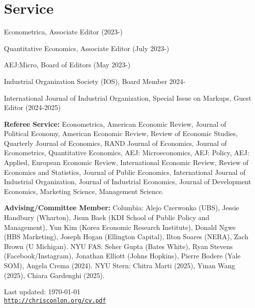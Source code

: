 \documentclass[letterpaper]{article}
\def\footerlink{http://chrisconlon.org/cv.pdf}
\renewenvironment{itemize}{
  \begin{list}{}{
    \setlength{\leftmargin}{1.5em}
  }
}{
  \end{list}
}
\begin{document}
\section*{Service}
\begin{itemize}
\item Econometrica, Associate Editor (2023-)
\item Quantitative Economics,  Associate Editor (July 2023-)
\item AEJ:Micro, Board of Editors (May 2023-)
\item Industrial Organization Society (IOS), Board Member 2024-
\item International Journal of Industrial Organization, Special Issue on Markups, Guest Editor (2024-2025)
\item \textbf{Referee Service:} Econometrica, American Economic Review, Journal of Political Economy, American Economic Review, Review of Economic Studies, Quarterly Journal of Economics, RAND Journal of Economics, Journal of Econometrics, Quantitative Economics, AEJ: Microeconomics, AEJ: Policy, AEJ: Applied, European Economic Review, International Economic Review, Review of Economics and Statistics, Journal of Public Economics, International Journal of Industrial Organization, Journal of Industrial Economics, Journal of Development Economics, Marketing Science, Management Science.
\item \textbf{Advising/Committee Member:}  Columbia: Alejo Czerwonko (UBS), Jessie Handbury (Wharton), Jisun Baek (KDI School of Public Policy and Management), Yun Kim (Korea Economic Research Institute), Donald Ngwe (HBS Marketing), Joseph Hogan (Ellington Capital), Ilton Soares (NERA), Zach Brown (U Michigan). NYU FAS: Seher Gupta (Bates White), Ryan Stevens (Facebook/Instagram), Jonathan Elliott (Johns Hopkins), Pierre Bodere (Yale SOM), Angela Crema (2024). NYU Stern: Chitra Marti (2025), Yinan Wang (2025), Chiara Gardenghi (2025).
\end{itemize}

\bigskip

\begin{center}
  \begin{footnotesize}
    Last updated: \today \\
    \href{\footerlink}{\texttt{\footerlink}}
  \end{footnotesize}
\end{center}
\end{document}
